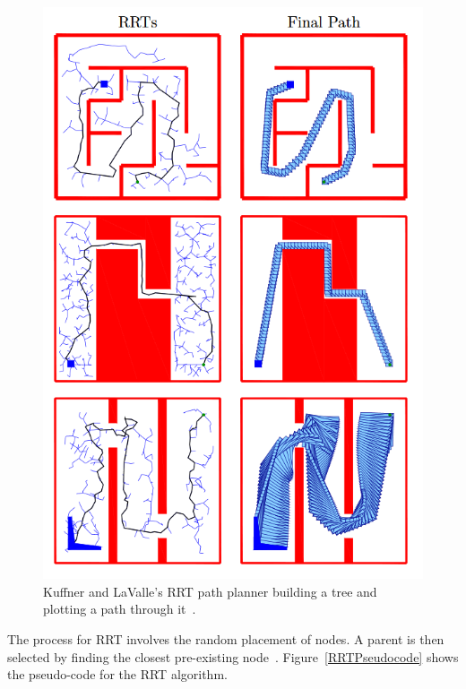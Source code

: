 \documentclass[journal]{IEEEtran}
\begin{document}
\begin{figure}[h]
	\includegraphics[width=1.0\linewidth]{KuffnerRRT.png}
	\caption{ Kuffner and LaValle's RRT path planner building a tree and plotting a path through it~\cite{Kuffner2000}.}
	\label{KuffnerRRT}
\end{figure} 


\begin{algorithmic}
	
	\EndFor
\end{algorithmic}



The process for RRT involves the random placement of nodes. A parent is then selected by finding the closest pre-existing node~\cite{Kuffner2000}. Figure~\ref{RRTPseudocode} shows the pseudo-code for the RRT algorithm. 
\end{document}
